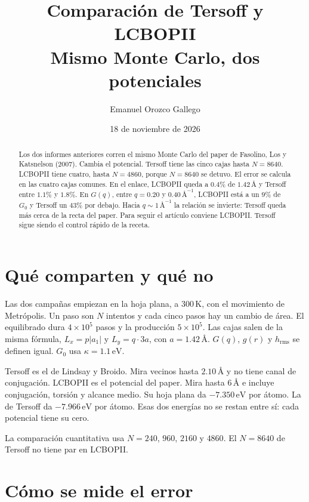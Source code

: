 \documentclass[11pt,a4paper]{article}
\title{Comparación de Tersoff y LCBOPII\\[0.35em]
\large Mismo Monte Carlo, dos potenciales}
\author{Emanuel Orozco Gallego}
\date{18 de noviembre de 2026}
\begin{document}
\maketitle

\begin{abstract}
Los dos informes anteriores corren el mismo Monte Carlo del paper de Fasolino, Los y Katsnelson (2007).
Cambia el potencial.
Tersoff tiene las cinco cajas hasta $N=8640$.
LCBOPII tiene cuatro, hasta $N=4860$, porque $N=8640$ se detuvo.
El error se calcula en las cuatro cajas comunes.
En el enlace, LCBOPII queda a $0.4\%$ de $1.42\,\text{\AA}$ y Tersoff entre $1.1\%$ y $1.8\%$.
En $G(q)$, entre $q=0.20$ y $0.40\,\text{\AA}^{-1}$, LCBOPII está a un $9\%$ de $G_0$ y Tersoff un $43\%$ por debajo.
Hacia $q\sim 1\,\text{\AA}^{-1}$ la relación se invierte: Tersoff queda más cerca de la recta del paper.
Para seguir el artículo conviene LCBOPII.
Tersoff sigue siendo el control rápido de la receta.
\end{abstract}

\tableofcontents

\section{Qué comparten y qué no}

Las dos campañas empiezan en la hoja plana, a $300\,\mathrm{K}$, con el movimiento de Metrópolis.
Un paso son $N$ intentos y cada cinco pasos hay un cambio de área.
El equilibrado dura $4\times 10^5$ pasos y la producción $5\times 10^5$.
Las cajas salen de la misma fórmula, $L_x=p|a_1|$ y $L_y=q\cdot 3a$, con $a=1.42\,\text{\AA}$.
$G(q)$, $g(r)$ y $h_{\mathrm{rms}}$ se definen igual.
$G_0$ usa $\kappa=1.1\,\mathrm{eV}$.

Tersoff es el de Lindsay y Broido.
Mira vecinos hasta $2.10\,\text{\AA}$ y no tiene canal de conjugación.
LCBOPII es el potencial del paper.
Mira hasta $6\,\text{\AA}$ e incluye conjugación, torsión y alcance medio.
Su hoja plana da $-7.350\,\mathrm{eV}$ por átomo.
La de Tersoff da $-7.966\,\mathrm{eV}$ por átomo.
Esas dos energías no se restan entre sí: cada potencial tiene su cero.

La comparación cuantitativa usa $N=240$, $960$, $2160$ y $4860$.
El $N=8640$ de Tersoff no tiene par en LCBOPII.

\section{Cómo se mide el error}
\end{document}
